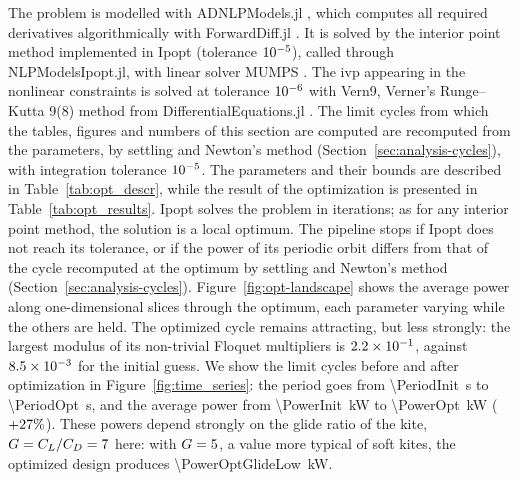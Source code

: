The problem is modelled with ADNLPModels.jl \cite{migot2021adnlpmodels}, which computes all required derivatives algorithmically with ForwardDiff.jl \cite{RevelsLubinPapamarkou2016}.
It is solved by the interior point method implemented in Ipopt \cite{WachterBiegler2006} (tolerance \(10^{-5}\)), called through NLPModelsIpopt.jl, with linear solver MUMPS \cite{amestoy2001mumps}.
The \ac{ivp} appearing in the nonlinear constraints is solved at tolerance \(10^{-6}\) with Vern9, Verner's Runge--Kutta 9(8) method from DifferentialEquations.jl \cite{rackauckas2017differentialequations}.
The limit cycles from which the tables, figures and numbers of this section are computed are recomputed from the parameters, by settling and Newton's method (Section~\ref{sec:analysis-cycles}), with integration tolerance \(10^{-5}\).
The parameters and their bounds are described in Table~\ref{tab:opt_descr}, while the result of the optimization is presented in Table~\ref{tab:opt_results}.
Ipopt solves the problem in \IpoptIter{} iterations; as for any interior point method, the solution is a local optimum.
The pipeline stops if Ipopt does not reach its tolerance, or if the power of its periodic orbit differs from that of the cycle recomputed at the optimum by settling and Newton's method (Section~\ref{sec:analysis-cycles}).
Figure~\ref{fig:opt-landscape} shows the average power along one-dimensional slices through the optimum, each parameter varying while the others are held.
The optimized cycle remains attracting, but less strongly: the largest modulus of its non-trivial Floquet multipliers is \(2.2 \times 10^{-1}\), against \(8.5 \times 10^{-3}\) for the initial guess.
We show the limit cycles before and after optimization in Figure~\ref{fig:time_series}: the period goes from \SI{\PeriodInit}{\second} to \SI{\PeriodOpt}{\second}, and the average power from \SI{\PowerInit}{\kilo\watt} to \SI{\PowerOpt}{\kilo\watt} (\(+27\%\)).
These powers depend strongly on the glide ratio of the kite, \(G = C_L/C_D = 7\) here: with \(G = 5\), a value more typical of soft kites, the optimized design produces \SI{\PowerOptGlideLow}{\kilo\watt}.

